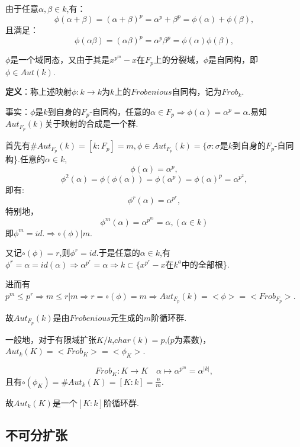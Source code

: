 \documentclass[UTF8]{article}
\begin{document}
由于任意$\alpha,\beta\in k$,有：
$$\phi(\alpha+\beta)=(\alpha+\beta)^p=\alpha^p + \beta^p=\phi(\alpha) +\phi(\beta),$$
且满足：
$$\phi(\alpha\beta)=(\alpha\beta)^p=\alpha^p\beta^p=\phi(\alpha)\phi(\beta),$$

$\phi$是一个域同态，又由于其是$x^{p^m}-x$在$F_p$上的分裂域，$\phi$是自同构，即$\phi\in Aut(k)$.

\textbf {定义}：称上述映射$\phi:k\rightarrow k$为$k$上的$Frobenious$自同构，记为$Frob_k$.

事实：$\phi$是$k$到自身的$F_p$-自同构，任意的$\alpha\in F_p\Rightarrow\phi(\alpha)=\alpha^p=\alpha$.易知$Aut_{F_p}(k)$关于映射的合成是一个群.

首先有$\# Aut_{F_p}(k)=[k:F_p]=m,\phi\in Aut_{F_p}(k)=\{\sigma:\sigma$是$k$到自身的$F_p$-自同构\}.任意的$\alpha\in k$,$$\phi(\alpha)=\alpha^p,$$
$$\phi^2(\alpha)=\phi(\phi(\alpha))=\phi(\alpha^p)=\phi(\alpha)^p=\alpha^{p^2},$$即有:
$$\phi^r(\alpha)=\alpha^{p^r},$$特别地，$$\phi^m(\alpha)=\alpha^{p^m}=\alpha,(\alpha\in k)$$即$\phi^m=id.\Rightarrow \circ(\phi)|m$.

又记$\circ(\phi)=r$,则$\phi^r=id$.于是任意的$\alpha\in k$,有$\phi^r=\alpha=id(\alpha)\Rightarrow \alpha^{p^r}=\alpha\Rightarrow k\subset\{x^{p^r}-x$在$k^a$中的全部根\}.

进而有$p^m\le p^r\Rightarrow m\le r|m\Rightarrow r=\circ(\phi)=m\Rightarrow Aut_{F_p}(k)=<\phi>=<Frob_{F_p}>$.

故$Aut_{F_p}(k)$是由$Frobenious$元生成的$m$阶循环群.

一般地，对于有限域扩张$K/k$,$char(k)=p$,($p$为素数)，$Aut_k(K)=<Frob_K>=<\phi_K>$.

$$Frob_K:K\rightarrow K\quad \alpha\mapsto \alpha^{p^m}=\alpha^{|k|},$$且有$\circ(\phi_K)=\#Aut_k(K)=[K:k]=\frac{n}{m}$.

故$Aut_k(K)$是一个$[K:k]$阶循环群.


	\subsection{不可分扩张}
\end{document}
